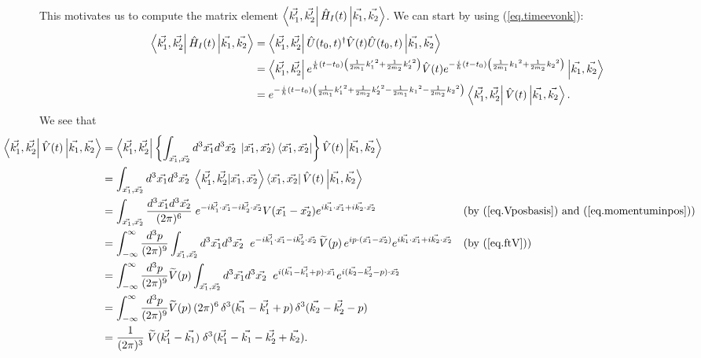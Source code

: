 This motivates us to compute the matrix element \(\left\langle\vec{k_1^\prime}, \vec{k_2^\prime}\right| \hat{H}_I(t)\left|\vec{k_1}, \vec{k_2}\right\rangle\). We can start by using (\ref{eq.timeevonk}):
\begin{align*}
\left\langle\vec{k_1^\prime}, \vec{k_2^\prime}\right| \hat{H}_I(t)\left|\vec{k_1}, \vec{k_2}\right\rangle
&= \left\langle\vec{k_1^\prime}, \vec{k_2^\prime}\right| \hat{U}(t_0, t)^\dagger \hat{V}(t) \hat{U}(t_0, t) \left|\vec{k_1}, \vec{k_2}\right\rangle \nonumber\\
&= \left\langle\vec{k_1^\prime}, \vec{k_2^\prime}\right| e^{\frac{i}{\hbar}\left(t-t_0\right)\left(\frac{1}{2m_1}{{k_1^\prime}}^2 + \frac{1}{2m_2}{{k_2^\prime}}^2\right)} \hat{V}(t) e^{-\frac{i}{\hbar}\left(t-t_0\right)\left(\frac{1}{2m_1}{k_1}^2 + \frac{1}{2m_2}{k_2}^2\right)} \left|\vec{k_1}, \vec{k_2}\right\rangle \nonumber\\
&= e^{-\frac{i}{\hbar}\left(t-t_0\right)\left(\frac{1}{2m_1}{{k_1^\prime}}^2 + \frac{1}{2m_2}{{k_2^\prime}}^2 - \frac{1}{2m_1}{k_1}^2 - \frac{1}{2m_2}{k_2}^2\right)} \left\langle\vec{k_1^\prime}, \vec{k_2^\prime}\right| \hat{V}(t) \left|\vec{k_1}, \vec{k_2}\right\rangle.
\end{align*}
We see that
\begin{align*}
\hspace{-4em}\bra{\vec{k_1^\prime}, \vec{k_2^\prime}} \op{V}(t) \ket{\vec{k_1}, \vec{k_2}} &= \bra{\vec{k_1^\prime}, \vec{k_2^\prime}} \left\{\int_{\vec{x_1}, \vec{x_2}} {d^3 \vec{x_1} d^3 \vec{x_2}\;} \ket{\vec{x_1}, \vec{x_2}}\bra{\vec{x_1}, \vec{x_2}}\right\}\op{V}(t) \ket{\vec{k_1}, \vec{k_2}} \nonumber\\
&= \int_{\vec{x_1}, \vec{x_2}} {d^3 \vec{x_1} d^3 \vec{x_2}\;} \braket{\vec{k_1^\prime}, \vec{k_2^\prime}}{\vec{x_1}, \vec{x_2}}\bra{\vec{x_1}, \vec{x_2}}\op{V}(t) \ket{\vec{k_1}, \vec{k_2}} \nonumber\\
&= \int_{\vec{x_1}, \vec{x_2}} \frac{d^3 \vec{x_1} d^3 \vec{x_2}}{(2\pi)^6}\; e^{-i\vec{k_1^\prime}\cdot \vec{x_1} - i\vec{k_2^\prime}\cdot \vec{x_2}}V(\vec{x_1} - \vec{x_2}) e^{i\vec{k_1}\cdot \vec{x_1} + i\vec{k_2}\cdot \vec{x_2}} &&\text{(by (\ref{eq.Vposbasis}) and (\ref{eq.momentuminpos}))}\nonumber\\
&= \int_{-\infty}^{\infty} \frac{d^3p}{(2\pi)^9}\int_{\vec{x_1}, \vec{x_2}} {d^3 \vec{x_1} d^3 \vec{x_2}\;\;}e^{-i\vec{k_1^\prime}\cdot \vec{x_1} - i\vec{k_2^\prime}\cdot \vec{x_2}}\,\widetilde{V}(p)\,e^{ip\cdot(\vec{x_1}-\vec{x_2})} e^{i\vec{k_1}\cdot \vec{x_1} + i\vec{k_2}\cdot \vec{x_2}}
&&\text{(by (\ref{eq.ftV}))}\nonumber\\
&= \int_{-\infty}^{\infty} \frac{d^3p}{(2\pi)^9}\widetilde{V}(p) \int_{\vec{x_1}, \vec{x_2}} {d^3 \vec{x_1} d^3 \vec{x_2}\;\;}e^{i(\vec{k_1}-\vec{k_1^\prime}+p)\cdot \vec{x_1}}e^{i(\vec{k_2}-\vec{k_2^\prime}-p)\cdot \vec{x_2}}\nonumber\\
&= \int_{-\infty}^{\infty} \frac{d^3p}{(2\pi)^9}\widetilde{V}(p) \,(2\pi)^6\,\delta^3(\vec{k_1}-\vec{k_1^\prime}+p)\,\delta^3(\vec{k_2}-\vec{k_2^\prime}-p)\nonumber\\
&= \frac{1}{(2\pi)^3}\;\widetilde{V}(\vec{k_1^\prime}-\vec{k_1}) \;\delta^3(\vec{k_1^\prime}-\vec{k_1}-\vec{k_2^\prime}+\vec{k_2}).
\end{align*}

